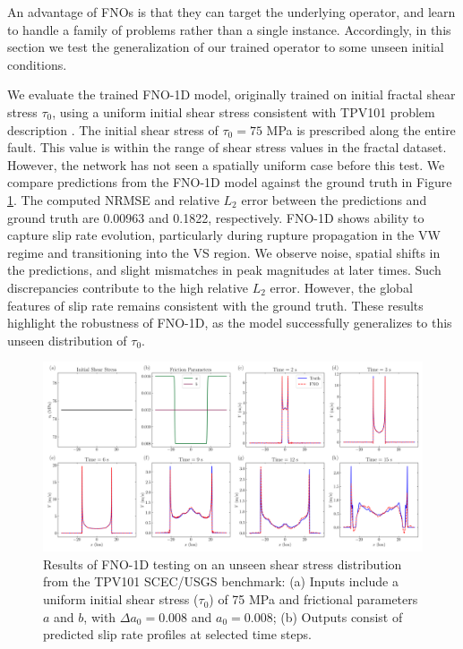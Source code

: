 \documentclass[draft]{agujournal2019}
\begin{document}
An advantage of FNOs is that they can target the underlying operator, and learn to handle a family of problems rather than a single instance. Accordingly, in this section we test the generalization of our trained operator to some unseen initial conditions.

We evaluate the trained FNO-1D model, originally trained on initial fractal shear stress \(\tau_{0}\), using a uniform initial shear stress consistent with TPV101 problem description \cite{harris2018suite, harris2009scec, kammer2021uguca}. The initial shear stress of \(\tau_{0} = 75\) MPa is prescribed along the entire fault. This value is within the range of shear stress values in the fractal dataset. However, the network has not seen a spatially uniform case before this test. We compare predictions from the FNO-1D model against the ground truth in Figure \ref{fig:2D_benchmark}. The computed NRMSE and relative \(L_2\) error between the predictions and ground truth are 0.00963 and 0.1822, respectively. FNO-1D shows ability to capture slip rate evolution, particularly during rupture propagation in the VW regime and transitioning into the VS region. We observe noise, spatial shifts in the predictions, and slight mismatches in peak magnitudes at later times. Such discrepancies contribute to the high relative \(L_2\) error. However, the global features of slip rate remains consistent with the ground truth. These results highlight the robustness of FNO-1D, as the model successfully generalizes to this unseen distribution of \(\tau_{0}\).

\begin{figure}
\centering
\includegraphics[width=1.0\linewidth]{2D_SCEC.png}
\caption{\label{fig:2D_benchmark}Results of FNO-1D testing on an unseen shear stress distribution from the TPV101 SCEC/USGS benchmark: (a) Inputs include a uniform initial shear stress (\(\tau_{0}\)) of 75 MPa and frictional parameters \(a\) and \(b\), with \(\Delta a_{0} = 0.008\) and \(a_{0} = 0.008\); (b) Outputs consist of predicted slip rate profiles at selected time steps.
}
\end{figure}
\end{document}
